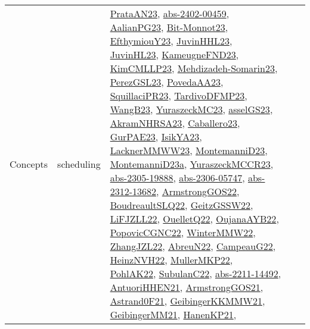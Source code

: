 {\begin{longtable}{llp{6cm}p{6cm}p{6cm}}
Concepts & scheduling & \href{articles/PrataAN23.pdf}{PrataAN23}\cite{PrataAN23}, \href{articles/abs-2402-00459.pdf}{abs-2402-00459}\cite{abs-2402-00459}, \href{papers/AalianPG23.pdf}{AalianPG23}\cite{AalianPG23}, \href{papers/Bit-Monnot23.pdf}{Bit-Monnot23}\cite{Bit-Monnot23}, \href{papers/EfthymiouY23.pdf}{EfthymiouY23}\cite{EfthymiouY23}, \href{papers/JuvinHHL23.pdf}{JuvinHHL23}\cite{JuvinHHL23}, \href{papers/JuvinHL23.pdf}{JuvinHL23}\cite{JuvinHL23}, \href{papers/KameugneFND23.pdf}{KameugneFND23}\cite{KameugneFND23}, \href{papers/KimCMLLP23.pdf}{KimCMLLP23}\cite{KimCMLLP23}, \href{papers/Mehdizadeh-Somarin23.pdf}{Mehdizadeh-Somarin23}\cite{Mehdizadeh-Somarin23}, \href{papers/PerezGSL23.pdf}{PerezGSL23}\cite{PerezGSL23}, \href{papers/PovedaAA23.pdf}{PovedaAA23}\cite{PovedaAA23}, \href{papers/SquillaciPR23.pdf}{SquillaciPR23}\cite{SquillaciPR23}, \href{papers/TardivoDFMP23.pdf}{TardivoDFMP23}\cite{TardivoDFMP23}, \href{papers/WangB23.pdf}{WangB23}\cite{WangB23}, \href{papers/YuraszeckMC23.pdf}{YuraszeckMC23}\cite{YuraszeckMC23}, \href{papers/asselGS23.pdf}{asselGS23}\cite{asselGS23}, \href{articles/AkramNHRSA23.pdf}{AkramNHRSA23}\cite{AkramNHRSA23}, \href{articles/Caballero23.pdf}{Caballero23}\cite{Caballero23}, \href{articles/GurPAE23.pdf}{GurPAE23}\cite{GurPAE23}, \href{articles/IsikYA23.pdf}{IsikYA23}\cite{IsikYA23}, \href{articles/LacknerMMWW23.pdf}{LacknerMMWW23}\cite{LacknerMMWW23}, \href{articles/MontemanniD23.pdf}{MontemanniD23}\cite{MontemanniD23}, \href{articles/MontemanniD23a.pdf}{MontemanniD23a}\cite{MontemanniD23a}, \href{articles/YuraszeckMCCR23.pdf}{YuraszeckMCCR23}\cite{YuraszeckMCCR23}, \href{articles/abs-2305-19888.pdf}{abs-2305-19888}\cite{abs-2305-19888}, \href{articles/abs-2306-05747.pdf}{abs-2306-05747}\cite{abs-2306-05747}, \href{articles/abs-2312-13682.pdf}{abs-2312-13682}\cite{abs-2312-13682}, \href{papers/ArmstrongGOS22.pdf}{ArmstrongGOS22}\cite{ArmstrongGOS22}, \href{papers/BoudreaultSLQ22.pdf}{BoudreaultSLQ22}\cite{BoudreaultSLQ22}, \href{papers/GeitzGSSW22.pdf}{GeitzGSSW22}\cite{GeitzGSSW22}, \href{papers/LiFJZLL22.pdf}{LiFJZLL22}\cite{LiFJZLL22}, \href{papers/OuelletQ22.pdf}{OuelletQ22}\cite{OuelletQ22}, \href{papers/OujanaAYB22.pdf}{OujanaAYB22}\cite{OujanaAYB22}, \href{papers/PopovicCGNC22.pdf}{PopovicCGNC22}\cite{PopovicCGNC22}, \href{papers/WinterMMW22.pdf}{WinterMMW22}\cite{WinterMMW22}, \href{papers/ZhangJZL22.pdf}{ZhangJZL22}\cite{ZhangJZL22}, \href{articles/AbreuN22.pdf}{AbreuN22}\cite{AbreuN22}, \href{articles/CampeauG22.pdf}{CampeauG22}\cite{CampeauG22}, \href{articles/HeinzNVH22.pdf}{HeinzNVH22}\cite{HeinzNVH22}, \href{articles/MullerMKP22.pdf}{MullerMKP22}\cite{MullerMKP22}, \href{articles/PohlAK22.pdf}{PohlAK22}\cite{PohlAK22}, \href{articles/SubulanC22.pdf}{SubulanC22}\cite{SubulanC22}, \href{articles/abs-2211-14492.pdf}{abs-2211-14492}\cite{abs-2211-14492}, \href{papers/AntuoriHHEN21.pdf}{AntuoriHHEN21}\cite{AntuoriHHEN21}, \href{papers/ArmstrongGOS21.pdf}{ArmstrongGOS21}\cite{ArmstrongGOS21}, \href{papers/Astrand0F21.pdf}{Astrand0F21}\cite{Astrand0F21}, \href{papers/GeibingerKKMMW21.pdf}{GeibingerKKMMW21}\cite{GeibingerKKMMW21}, \href{papers/GeibingerMM21.pdf}{GeibingerMM21}\cite{GeibingerMM21}, \href{papers/HanenKP21.pdf}{HanenKP21}\cite{HanenKP21}, 
\end{longtable}}
